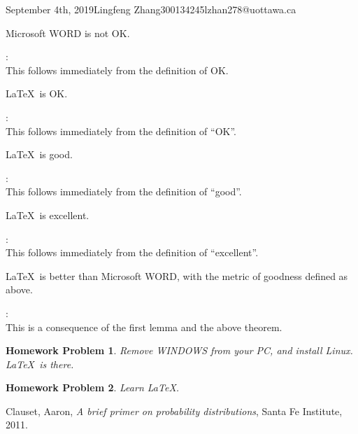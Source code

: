 \documentclass{article}
\newtheorem{hw}{Homework Problem}
\begin{document}
\begin{lecture}{September 4th, 2019}{Lingfeng Zhang}{300134245}{lzhan278@uottawa.ca}
\begin{lemma}
Microsoft WORD is not OK.
\end{lemma}

\Proof :\\
This follows immediately from the definition of OK.
\QED

\begin{lemma}
\LaTeX\ is OK.
\end{lemma}

\Proof :\\
This follows immediately from the definition of ``OK''.
\QED

\begin{proposition}
\LaTeX\ is good.
\end{proposition}

\Proof :\\
This follows immediately from the definition of ``good''.
\QED

\begin{theorem} \LaTeX\ is excellent.
\end{theorem}

\Proof :\\
This follows immediately from the definition of ``excellent''.
\QED

\begin{corollary}
\LaTeX\  is better than Microsoft WORD, with the metric of goodness
defined as above.
\end{corollary}

\Proof :\\
This is a consequence of the first lemma and the above theorem. \QED

\begin{hw}
Remove WINDOWS from your PC, and install Linux. 
\LaTeX\ is there.
\end{hw}

\begin{hw}
Learn \LaTeX.
\end{hw}


\begin{thebibliography}{999}
  Clauset, Aaron,
  \textit{A brief primer on probability distributions},
  Santa Fe Institute,
  2011.
\end{thebibliography}

\end{lecture}
\end{document}

